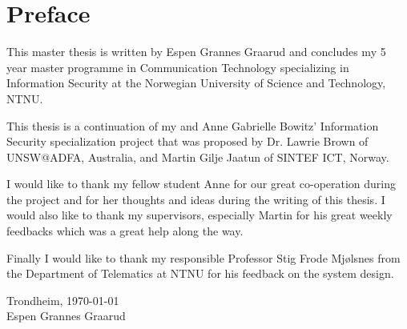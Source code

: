 \chapter*{Preface}

This master thesis is written by Espen Grannes Graarud and concludes my 5
year master programme in Communication Technology specializing in Information
Security at the Norwegian University of Science and Technology, NTNU.

This thesis is a continuation of my and Anne Gabrielle Bowitz' Information
Security specialization project that was proposed by Dr. Lawrie Brown of
UNSW@ADFA, Australia, and Martin Gilje Jaatun of SINTEF ICT, Norway.

I would like to thank my fellow student Anne for our great co-operation during
the project and for her thoughts and ideas during the writing of this thesis. I
would also like to thank my supervisors, especially Martin for his great weekly
feedbacks which was a great help along the way.

Finally I would like to thank my responsible Professor Stig Frode Mj{\o}lsnes
from the Department of Telematics at NTNU for his feedback on the system design.

\begin{center}
\vspace{4cm}
\noindent Trondheim, \today
\vspace{2cm}
\\Espen Grannes Graarud
\end{center}
